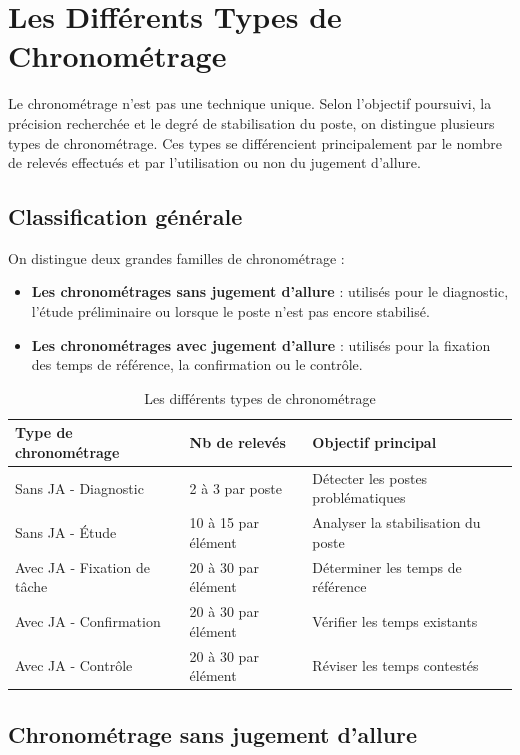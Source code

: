 \documentclass[a4paper,12pt]{article}
\begin{document}
\section{Les Différents Types de Chronométrage}

Le chronométrage n'est pas une technique unique. Selon l'objectif poursuivi, la précision recherchée et le degré de stabilisation du poste, on distingue plusieurs types de chronométrage. Ces types se différencient principalement par le nombre de relevés effectués et par l'utilisation ou non du jugement d'allure.

\subsection{Classification générale}

On distingue deux grandes familles de chronométrage :

\begin{itemize}
    \item \textbf{Les chronométrages sans jugement d'allure} : utilisés pour le diagnostic, l'étude préliminaire ou lorsque le poste n'est pas encore stabilisé.
    \item \textbf{Les chronométrages avec jugement d'allure} : utilisés pour la fixation des temps de référence, la confirmation ou le contrôle.
\end{itemize}

\begin{table}[ht]
\centering
\begin{tabular}{|p{4.5cm}|p{3.5cm}|p{7cm}|}
\hline
\textbf{Type de chronométrage} & \textbf{Nb de relevés} & \textbf{Objectif principal} \\
\hline
Sans JA - Diagnostic & 2 à 3 par poste & Détecter les postes problématiques \\
Sans JA - Étude & 10 à 15 par élément & Analyser la stabilisation du poste \\
Avec JA - Fixation de tâche & 20 à 30 par élément & Déterminer les temps de référence \\
Avec JA - Confirmation & 20 à 30 par élément & Vérifier les temps existants \\
Avec JA - Contrôle & 20 à 30 par élément & Réviser les temps contestés \\
\hline
\end{tabular}
\caption{Les différents types de chronométrage}
\end{table}

\subsection{Chronométrage sans jugement d'allure}
\end{document}
